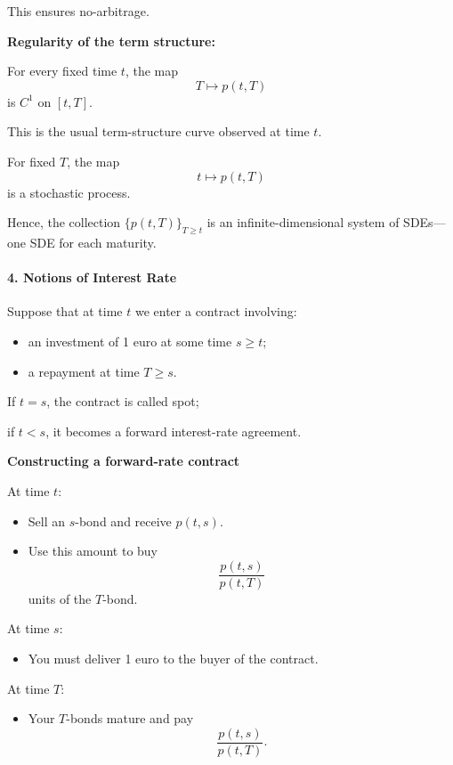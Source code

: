 \documentclass[12pt,a4paper]{article}
\theoremstyle{definition}
\begin{document}
This ensures no-arbitrage.

\textbf{Regularity of the term structure:}

For every fixed time $t$, the map
\[
T \mapsto p(t, T)
\]
is $C^1$ on $[t, T]$.

This is the usual term-structure curve observed at time $t$.

For fixed $T$, the map
\[
t \mapsto p(t, T)
\]
is a stochastic process.

Hence, the collection $\{p(t, T)\}_{T \geq t}$ is an infinite-dimensional system of SDEs---one SDE for each maturity.

\paragraph{4. Notions of Interest Rate}

Suppose that at time $t$ we enter a contract involving:

\begin{itemize}
\item an investment of 1 euro at some time $s \geq t$;
\item a repayment at time $T \geq s$.
\end{itemize}

If $t = s$, the contract is called spot;

if $t < s$, it becomes a forward interest-rate agreement.

\textbf{Constructing a forward-rate contract}

At time $t$:

\begin{itemize}
\item Sell an $s$-bond and receive $p(t, s)$.

\item Use this amount to buy
\[
\frac{p(t, s)}{p(t, T)}
\]
units of the $T$-bond.
\end{itemize}

At time $s$:

\begin{itemize}
\item You must deliver 1 euro to the buyer of the contract.
\end{itemize}

At time $T$:

\begin{itemize}
\item Your $T$-bonds mature and pay
\[
\frac{p(t, s)}{p(t, T)}.
\]
\end{itemize}
\end{document}
